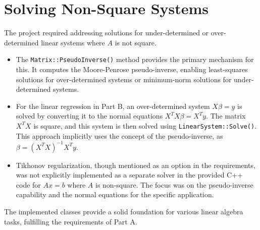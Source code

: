 \section{Solving Non-Square Systems}
\label{sec:nonsquare_systems}
The project required addressing solutions for under-determined or over-determined linear systems where $A$ is not square.
\begin{itemize}
    \item The \texttt{Matrix::PseudoInverse()} method provides the primary mechanism for this. It computes the Moore-Penrose pseudo-inverse, enabling least-squares solutions for over-determined systems or minimum-norm solutions for under-determined systems.
    \item For the linear regression in Part B, an over-determined system $X\beta = y$ is solved by converting it to the normal equations $X^T X \beta = X^T y$. The matrix $X^T X$ is square, and this system is then solved using \texttt{LinearSystem::Solve()}. This approach implicitly uses the concept of the pseudo-inverse, as $\beta = (X^T X)^{-1} X^T y$.
    \item Tikhonov regularization, though mentioned as an option in the requirements, was not explicitly implemented as a separate solver in the provided C++ code for $Ax=b$ where $A$ is non-square. The focus was on the pseudo-inverse capability and the normal equations for the specific application.
\end{itemize}
The implemented classes provide a solid foundation for various linear algebra tasks, fulfilling the requirements of Part A.
